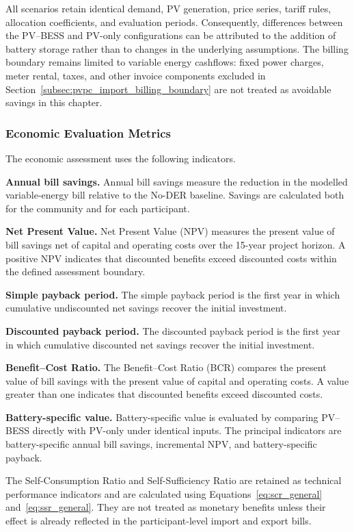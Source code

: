 All scenarios retain identical demand, PV generation, price series, tariff rules, allocation coefficients, and evaluation periods. Consequently, differences between the PV--BESS and PV-only configurations can be attributed to the addition of battery storage rather than to changes in the underlying assumptions. The billing boundary remains limited to variable energy cashflows: fixed power charges, meter rental, taxes, and other invoice components excluded in Section~\ref{subsec:pvpc_import_billing_boundary} are not treated as avoidable savings in this chapter.

\subsubsection{Economic Evaluation Metrics}
\label{sec:ch5_economic_metrics}

The economic assessment uses the following indicators.

\textbf{Annual bill savings.} Annual bill savings measure the reduction in the modelled variable-energy bill relative to the No-DER baseline. Savings are calculated both for the community and for each participant.

\textbf{Net Present Value.} Net Present Value (NPV) measures the present value of bill savings net of capital and operating costs over the 15-year project horizon. A positive NPV indicates that discounted benefits exceed discounted costs within the defined assessment boundary.

\textbf{Simple payback period.} The simple payback period is the first year in which cumulative undiscounted net savings recover the initial investment.

\textbf{Discounted payback period.} The discounted payback period is the first year in which cumulative discounted net savings recover the initial investment.

\textbf{Benefit--Cost Ratio.} The Benefit--Cost Ratio (BCR) compares the present value of bill savings with the present value of capital and operating costs. A value greater than one indicates that discounted benefits exceed discounted costs.

\textbf{Battery-specific value.} Battery-specific value is evaluated by comparing PV--BESS directly with PV-only under identical inputs. The principal indicators are battery-specific annual bill savings, incremental NPV, and battery-specific payback.

The Self-Consumption Ratio and Self-Sufficiency Ratio are retained as technical performance indicators and are calculated using Equations~\eqref{eq:scr_general} and~\eqref{eq:ssr_general}. They are not treated as monetary benefits unless their effect is already reflected in the participant-level import and export bills.

